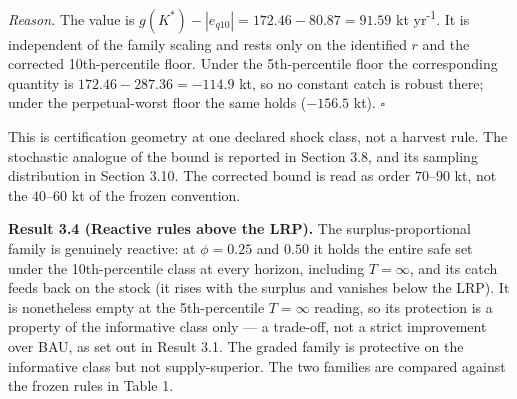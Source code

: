 \documentclass[11pt]{article}
\begin{document}
\emph{Reason.} The value is
\(g(K^*) - |e_{q10}| = 172.46 - 80.87 = 91.59\) kt yr\textsuperscript{-1}. It is
independent of the family scaling and rests only on the identified \(r\)
and the corrected 10th-percentile floor. Under the 5th-percentile floor
the corresponding quantity is \(172.46 - 287.36 = -114.9\) kt, so no
constant catch is robust there; under the perpetual-worst floor the same
holds (\(-156.5\) kt). \ensuremath{\square}

This is certification geometry at one declared shock class, not a
harvest rule. The stochastic analogue of the bound is reported in
Section 3.8, and its sampling distribution in Section 3.10. The
corrected bound is read as order \(70\)--\(90\) kt, not the
\(40\)--\(60\) kt of the frozen convention.

\textbf{Result 3.4 (Reactive rules above the LRP).} The
surplus-proportional family is genuinely reactive: at \(\phi = 0.25\)
and \(0.50\) it holds the entire safe set under the 10th-percentile
class at every horizon, including \(T = \infty\), and its catch feeds
back on the stock (it rises with the surplus and vanishes below the
LRP). It is nonetheless empty at the 5th-percentile \(T=\infty\)
reading, so its protection is a property of the informative class only
--- a trade-off, not a strict improvement over BAU, as set out in Result
3.1. The graded family is protective on the informative class but not
supply-superior. The two families are compared against the frozen rules
in Table 1.
\end{document}
